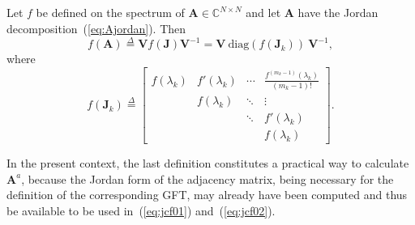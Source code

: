 \vspace{0.2cm}
\begin{definition}\label{def:jc01}
    Let $f$ be defined on the spectrum of $\mathbf{A}\in\mathbb{C}^{N\times N}$ and let $\mathbf{A}$ have the Jordan decomposition~(\ref{eq:Ajordan}). Then
    \begin{equation}\label{eq:jcf01}
        f(\mathbf{A})\overset{\Delta}{=}\mathbf{V}f(\mathbf{J})\mathbf{V}^{-1}=\mathbf{V} \ \mathrm{diag}(f(\mathbf{J}_k)) \ \mathbf{V}^{-1},
    \end{equation}
    where
    \begin{equation}\label{eq:jcf02}
        f(\mathbf{J}_k)\overset{\Delta}{=}\left[\begin{array}{cccc}
                f(\lambda_k) & f'(\lambda_k) & \cdots & \frac{f^{(m_k-1)}(\lambda_k)}{(m_k-1)!} \\
                             & f(\lambda_k)  & \ddots & \vdots                                  \\
                             &               & \ddots & f'(\lambda_k)                           \\
                             &               &        & f(\lambda_k)\end{array}\right].
    \end{equation}
\end{definition}
In the present context, the last definition constitutes a practical way to calculate $\mathbf{A}^a$, because the Jordan form of the adjacency matrix, being necessary for the definition of the corresponding GFT, may already have been computed and thus be available to be used in~(\ref{eq:jcf01}) and~(\ref{eq:jcf02}).


